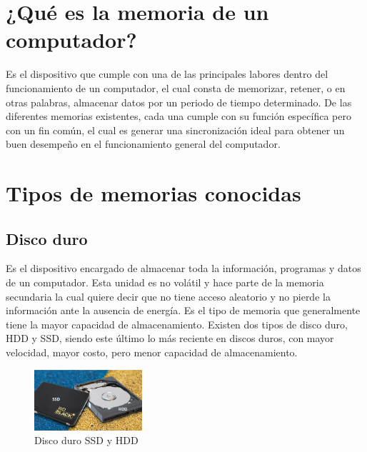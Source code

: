 \documentclass{article}
\begin{document}
\section{¿Qué es la memoria de un computador?}
\noindent Es el dispositivo que cumple con una de las principales labores dentro del funcionamiento de un computador, el cual consta de memorizar, retener, o en otras palabras, almacenar datos por un periodo de tiempo determinado. De las diferentes memorias existentes, cada una cumple con su función específica pero con un fin común, el cual es generar una sincronización ideal para obtener un buen desempeño en el funcionamiento general del computador. \cite{gestion}

\section{Tipos de memorias conocidas} \label{contenido}

\subsection{Disco duro}

\noindent Es el dispositivo encargado de almacenar toda la información, programas y datos de un computador. Esta unidad es no volátil y hace parte de la memoria secundaria la cual quiere decir que no tiene acceso aleatorio y no pierde la información ante la ausencia de energía. Es el tipo de memoria que generalmente tiene la mayor capacidad de almacenamiento. Existen dos tipos de disco duro, HDD y SSD, siendo este último lo más reciente en discos duros, con mayor velocidad, mayor costo, pero menor capacidad de almacenamiento. \cite{wikipedia}

\begin{figure}[h]
\includegraphics[width=4cm]{discoduro.PNG}
\centering
\caption{Disco duro SSD y HDD}
\end{figure}
\end{document}
